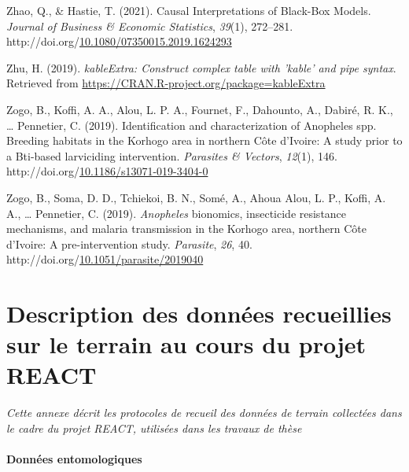 \documentclass[12pt,twoside]{reedthesis}
\newlength{\cslhangindent}
\newenvironment{CSLReferences}[2] %
 {%
  \setlength{\parindent}{0pt}
  \ifodd #1 \everypar{\setlength{\hangindent}{\cslhangindent}}\ignorespaces\fi
  \ifnum #2 > 0
  \setlength{\parskip}{#2\baselineskip}
  \fi
 }%
 {}
\begin{document}
\begin{CSLReferences}{1}{0}
\leavevmode{}%
Zhao, Q., \& Hastie, T. (2021). Causal {Interpretations} of {Black}-{Box} {Models}. \emph{Journal of Business \& Economic Statistics}, \emph{39}(1), 272--281. http://doi.org/\href{https://doi.org/10.1080/07350015.2019.1624293}{10.1080/07350015.2019.1624293}

\leavevmode{}%
Zhu, H. (2019). \emph{kableExtra: Construct complex table with 'kable' and pipe syntax}. Retrieved from \url{https://CRAN.R-project.org/package=kableExtra}

\leavevmode{}%
Zogo, B., Koffi, A. A., Alou, L. P. A., Fournet, F., Dahounto, A., Dabiré, R. K., \ldots{} Pennetier, C. (2019). Identification and characterization of {Anopheles} spp. Breeding habitats in the {Korhogo} area in northern {Côte} d'{Ivoire}: A study prior to a {Bti}-based larviciding intervention. \emph{Parasites \& Vectors}, \emph{12}(1), 146. http://doi.org/\href{https://doi.org/10.1186/s13071-019-3404-0}{10.1186/s13071-019-3404-0}

\leavevmode{}%
Zogo, B., Soma, D. D., Tchiekoi, B. N., Somé, A., Ahoua Alou, L. P., Koffi, A. A., \ldots{} Pennetier, C. (2019). \emph{Anopheles} bionomics, insecticide resistance mechanisms, and malaria transmission in the {Korhogo} area, northern {Côte} d'{Ivoire}: A pre-intervention study. \emph{Parasite}, \emph{26}, 40. http://doi.org/\href{https://doi.org/10.1051/parasite/2019040}{10.1051/parasite/2019040}

\end{CSLReferences}
\endgroup

\appendix

\hypertarget{data-terrain}{%
\chapter{Description des données recueillies sur le terrain au cours du projet REACT}\label{data-terrain}}

\emph{Cette annexe décrit les protocoles de recueil des données de terrain collectées dans le cadre du projet REACT, utilisées dans les travaux de thèse}

\hypertarget{entomo-data}{%
\subsubsection{Données entomologiques}\label{entomo-data}}
\end{document}
